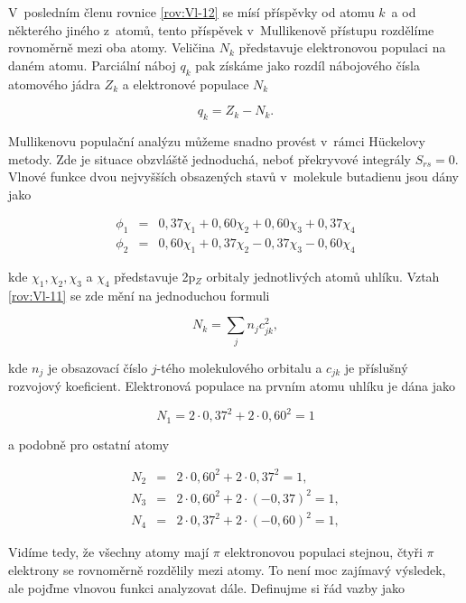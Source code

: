 \noindent V~posledním členu rovnice \eqref{rov:Vl-12} se mísí příspěvky od atomu $k$~a od některého jiného z~atomů, tento příspěvek v~Mullikenově přístupu rozdělíme rovnoměrně mezi oba atomy. Veličina $N_k$ představuje elektronovou populaci na daném atomu. Parciální náboj $q_k$ pak získáme jako rozdíl nábojového čísla atomového jádra $Z_k$ a elektronové populace $N_k$

\begin{equation}
q_k = Z_k - N_k.
\label{rov:Vl-13}
\end{equation}


\begin{priklad}
Mullikenovu populační analýzu můžeme snadno provést v~rámci H\"uckelovy metody. Zde je situace obzvláště jednoduchá, neboť překryvové integrály $S_{rs}=0$. Vlnové funkce dvou nejvyšších obsazených stavů v~molekule butadienu jsou dány jako

\begin{eqnarray*}
\phi_1 &=& 0{,}37 \chi_1 + 0{,}60 \chi_2 + 0{,}60 \chi_3 + 0{,}37 \chi_4\\
\phi_2 &=& 0{,}60 \chi_1 + 0{,}37 \chi_2 - 0{,}37 \chi_3 - 0{,}60 \chi_4
\end{eqnarray*}
 
\noindent kde $\chi_1,\chi_2, \chi_3$ a $\chi_4$ představuje 2p$_Z$ orbitaly jednotlivých atomů uhlíku. Vztah \eqref{rov:Vl-11} se zde mění na jednoduchou formuli

\begin{equation}
N_k = \sum_j n_j c_{jk}^2, \nonumber
\end{equation}

\noindent kde $n_j$ je obsazovací číslo $j$-tého molekulového orbitalu a $c_{jk}$ je příslušný rozvojový koeficient. Elektronová populace na prvním atomu uhlíku je dána jako

\begin{equation}
N_1 = 2 \cdot 0{,}37^2 + 2 \cdot 0{,}60^2 = 1 \nonumber
\end{equation}


\noindent a podobně pro ostatní atomy

\begin{eqnarray*}
N_2 &=& 2 \cdot 0{,}60^2 + 2 \cdot 0{,}37^2 = 1, \\
N_3 &=& 2 \cdot 0{,}60^2 + 2 \cdot (-0{,}37)^2 = 1, \\
N_4 &=& 2 \cdot 0{,}37^2 + 2 \cdot (-0{,}60)^2 = 1,
\end{eqnarray*}

Vidíme tedy, že všechny atomy mají $\pi$ elektronovou populaci stejnou, čtyři $\pi$ elektrony se rovnoměrně rozdělily mezi atomy. To není moc zajímavý výsledek, ale pojďme vlnovou funkci analyzovat dále. Definujme si řád vazby jako



\end{priklad}
